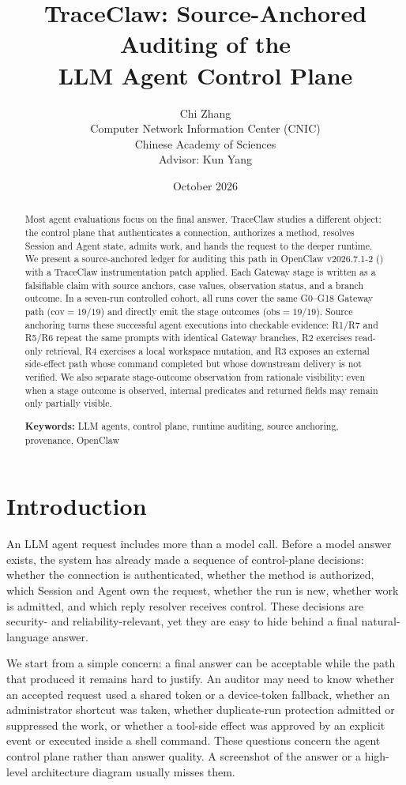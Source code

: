 \documentclass[11pt,a4paper]{article}
\title{TraceClaw: Source-Anchored Auditing of the\\
LLM Agent Control Plane}
\author{Chi Zhang\\[0.4em]
\normalsize Computer Network Information Center (CNIC)\\
\normalsize Chinese Academy of Sciences\\[0.6em]
\normalsize Advisor: Kun Yang}
\date{October 2026}
\begin{document}
\maketitle

\begin{abstract}
Most agent evaluations focus on the final answer. TraceClaw studies a
different object: the control plane that authenticates a connection,
authorizes a method, resolves Session and Agent state, admits work, and
hands the request to the deeper runtime. We present a source-anchored
ledger for auditing this path in OpenClaw v2026.7.1-2
() with a TraceClaw
instrumentation patch applied. Each Gateway stage is written as a
falsifiable claim with source anchors, case values, observation status,
and a branch outcome. In a seven-run controlled cohort, all runs cover
the same G0--G18 Gateway path (\(\mathrm{cov}=19/19\)) and directly emit
the stage outcomes (\(\mathrm{obs}=19/19\)). Source anchoring turns these
successful agent executions into checkable evidence:
R1/R7 and R5/R6 repeat the same prompts with identical Gateway branches,
R2 exercises read-only retrieval, R4 exercises a local workspace
mutation, and R3 exposes an external side-effect path whose command
completed but whose downstream delivery is not verified. We also separate
stage-outcome observation from rationale visibility: even when
a stage outcome is observed, internal predicates and returned fields may
remain only partially visible.

\medskip
\noindent\textbf{Keywords:} LLM agents, control plane, runtime auditing,
source anchoring, provenance, OpenClaw
\end{abstract}

\section{Introduction}
\label{sec:introduction}

An LLM agent request includes more than a model call. Before a model
answer exists, the system has already made a sequence of control-plane
decisions: whether the connection is authenticated, whether the method is
authorized, which Session and Agent own the request, whether the run is
new, whether work is admitted, and which reply resolver receives control.
These decisions are security- and reliability-relevant, yet they are easy
to hide behind a final natural-language answer.

We start from a simple concern: a final answer can be acceptable while
the path that produced it remains hard to justify. An auditor may need to
know whether an accepted request used a shared token or a device-token
fallback, whether an administrator shortcut was taken, whether
duplicate-run protection admitted or suppressed the work, or whether a
tool-side effect was approved by an explicit event or executed inside a
shell command. These questions concern the agent control plane rather
than answer quality. A screenshot of the answer or a high-level
architecture diagram usually misses them.
\end{document}
